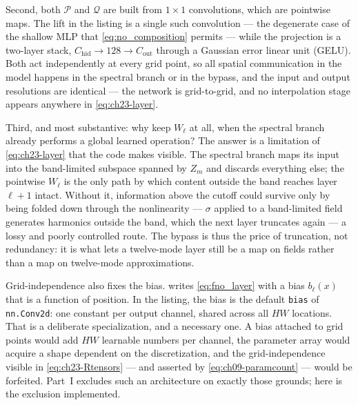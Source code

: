 Second, both $\mathcal{P}$ and $\mathcal{Q}$ are built from $1 \times 1$
convolutions, which are pointwise maps. The lift in the listing is a single such
convolution --- the degenerate case of the shallow MLP that
\eqref{eq:no_composition} permits --- while the projection is a two-layer
stack, $C_{\text{hid}} \to 128 \to C_{\text{out}}$ through a Gaussian error
linear unit (GELU). Both act independently at every grid point, so all spatial
communication in the model happens in the spectral branch or in the bypass, and
the input and output resolutions are identical --- the network is grid-to-grid,
and no interpolation stage appears anywhere in \eqref{eq:ch23-layer}.

Third, and most substantive: why keep $W_\ell$ at all, when the spectral branch
already performs a global learned operation? The answer is a limitation of
\eqref{eq:ch23-layer} that the code makes visible. The spectral branch maps its
input into the band-limited subspace spanned by $Z_m$ and discards everything
else; the pointwise $W_\ell$ is the only path by which content outside the band
reaches layer $\ell + 1$ intact. Without it, information above the cutoff could
survive only by being folded down through the nonlinearity --- $\sigma$ applied
to a band-limited field generates harmonics outside the band, which the next
layer truncates again --- a lossy and poorly controlled route. The bypass is thus
the price of truncation, not redundancy: it is what lets a twelve-mode layer
still be a map on fields rather than a map on twelve-mode
approximations.

Grid-independence also fixes the bias. 
writes \eqref{eq:fno_layer} with a bias $b_\ell(x)$ that is a function of
position. In the listing, the bias is the default \texttt{bias} of
\texttt{nn.Conv2d}: one constant per output channel, shared across all $HW$
locations. That is a deliberate specialization, and a necessary one. A bias
attached to grid points would add $HW$ learnable numbers per channel, the
parameter array would acquire a shape dependent on the discretization, and the
grid-independence visible in \eqref{eq:ch23-Rtensors} --- and asserted by
\eqref{eq:ch09-paramcount} --- would be forfeited. Part~I excludes such an
architecture on exactly those grounds; here is the exclusion implemented.

